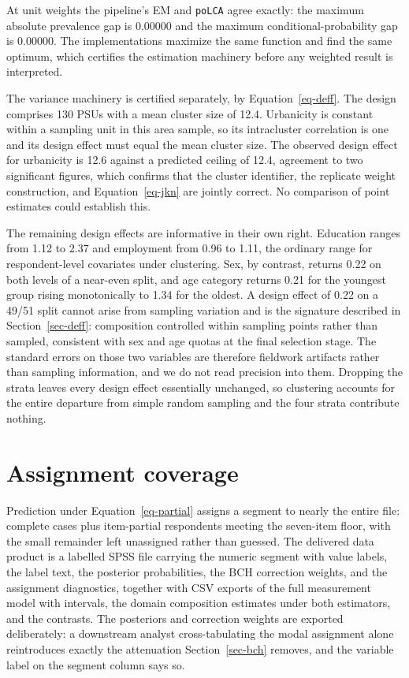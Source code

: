 \documentclass[
  12pt]{article}
\begin{document}
At unit weights the pipeline's EM and \texttt{poLCA} agree exactly: the
maximum absolute prevalence gap is 0.00000 and the maximum
conditional-probability gap is 0.00000. The implementations maximize the
same function and find the same optimum, which certifies the estimation
machinery before any weighted result is interpreted.

The variance machinery is certified separately, by
Equation~\ref{eq-deff}. The design comprises 130 PSUs with a mean
cluster size of 12.4. Urbanicity is constant within a sampling unit in
this area sample, so its intracluster correlation is one and its design
effect must equal the mean cluster size. The observed design effect for
urbanicity is 12.6 against a predicted ceiling of 12.4, agreement to two
significant figures, which confirms that the cluster identifier, the
replicate weight construction, and Equation~\ref{eq-jkn} are jointly
correct. No comparison of point estimates could establish this.

The remaining design effects are informative in their own right.
Education ranges from 1.12 to 2.37 and employment from 0.96 to 1.11, the
ordinary range for respondent-level covariates under clustering. Sex, by
contrast, returns 0.22 on both levels of a near-even split, and age
category returns 0.21 for the youngest group rising monotonically to
1.34 for the oldest. A design effect of 0.22 on a 49/51 split cannot
arise from sampling variation and is the signature described in
Section~\ref{sec-deff}: composition controlled within sampling points
rather than sampled, consistent with sex and age quotas at the final
selection stage. The standard errors on those two variables are
therefore fieldwork artifacts rather than sampling information, and we
do not read precision into them. Dropping the strata leaves every design
effect essentially unchanged, so clustering accounts for the entire
departure from simple random sampling and the four strata contribute
nothing.

\section{Assignment coverage}\label{sec-results-assignment}

Prediction under Equation~\ref{eq-partial} assigns a segment to nearly
the entire file: complete cases plus item-partial respondents meeting
the seven-item floor, with the small remainder left unassigned rather
than guessed. The delivered data product is a labelled SPSS file
carrying the numeric segment with value labels, the label text, the
posterior probabilities, the BCH correction weights, and the assignment
diagnostics, together with CSV exports of the full measurement model
with intervals, the domain composition estimates under both estimators,
and the contrasts. The posteriors and correction weights are exported
deliberately: a downstream analyst cross-tabulating the modal assignment
alone reintroduces exactly the attenuation Section~\ref{sec-bch}
removes, and the variable label on the segment column says so.
\end{document}
